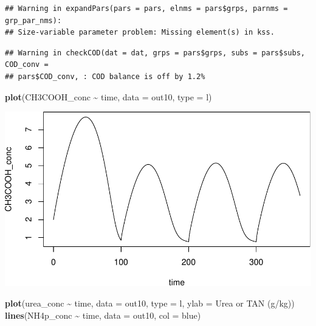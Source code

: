 \documentclass[
]{article}
\newenvironment{Shaded}{\begin{snugshade}}{\end{snugshade}}
\newcommand{\AttributeTok}[1]{\textcolor[rgb]{0.13,0.29,0.53}{#1}}
\newcommand{\FunctionTok}[1]{\textcolor[rgb]{0.13,0.29,0.53}{\textbf{#1}}}
\newcommand{\NormalTok}[1]{#1}
\newcommand{\SpecialCharTok}[1]{\textcolor[rgb]{0.81,0.36,0.00}{\textbf{#1}}}
\newcommand{\StringTok}[1]{\textcolor[rgb]{0.31,0.60,0.02}{#1}}
\begin{document}
\begin{verbatim}
## Warning in expandPars(pars = pars, elnms = pars$grps, parnms = grp_par_nms):
## Size-variable parameter problem: Missing element(s) in kss.
\end{verbatim}

\begin{verbatim}
## Warning in checkCOD(dat = dat, grps = pars$grps, subs = pars$subs, COD_conv =
## pars$COD_conv, : COD balance is off by 1.2%
\end{verbatim}

\begin{Shaded}
\begin{Highlighting}[]
\FunctionTok{plot}\NormalTok{(CH3COOH\_conc }\SpecialCharTok{\textasciitilde{}}\NormalTok{ time, }\AttributeTok{data =}\NormalTok{ out10, }\AttributeTok{type =} \StringTok{\textquotesingle{}l\textquotesingle{}}\NormalTok{)}
\end{Highlighting}
\end{Shaded}

\includegraphics{simple_demo_files/figure-latex/unnamed-chunk-76-1.pdf}

\begin{Shaded}
\begin{Highlighting}[]
\FunctionTok{plot}\NormalTok{(urea\_conc }\SpecialCharTok{\textasciitilde{}}\NormalTok{ time, }\AttributeTok{data =}\NormalTok{ out10, }\AttributeTok{type =} \StringTok{\textquotesingle{}l\textquotesingle{}}\NormalTok{, }\AttributeTok{ylab =} \StringTok{\textquotesingle{}Urea or TAN (g/kg)\textquotesingle{}}\NormalTok{)}
\FunctionTok{lines}\NormalTok{(NH4p\_conc }\SpecialCharTok{\textasciitilde{}}\NormalTok{ time, }\AttributeTok{data =}\NormalTok{ out10, }\AttributeTok{col =} \StringTok{\textquotesingle{}blue\textquotesingle{}}\NormalTok{)}
\end{Highlighting}
\end{Shaded}
\end{document}
